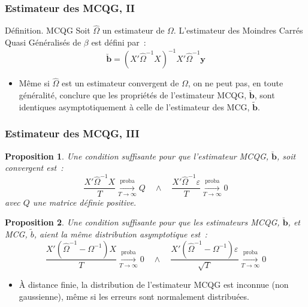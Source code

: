 \documentclass[10pt]{beamer}
\newcommand{\plim}{\overset{\text{proba}}{\underset{T\rightarrow\infty}{\longrightarrow}}}
\theoremstyle{plain}
\newenvironment{defn}[1]
{\bgroup \small\begin{block}{Définition. #1}}
  {\end{block}\egroup}
\newtheorem{prop}{Proposition}
\begin{document}
\begin{frame}
  \frametitle{Estimateur des MCQG, II}

  \begin{defn}{MCQG}
    Soit $\widehat\Omega$ un estimateur de $\Omega$. L'estimateur des Moindres Carrés Quasi Généralisés de $\beta$ est défini par~:
    \[
      \breve{\mathbf b} = \left( X'\widehat{\Omega}^{-1}X \right)^{-1}X'\widehat{\Omega}^{-1}\mathbf y
    \]
  \end{defn}

  \bigskip\medskip

  \begin{itemize}

  \item[\dbend] Même si $\widehat\Omega$ est un estimateur convergent de $\Omega$, on ne peut pas, en toute généralité, conclure que les propriétés de l'estimateur MCQG, $\breve{\mathbf b}$, sont identiques asymptotiquement à celle de l'estimateur des MCG, $\tilde{\mathbf b}$.

  \end{itemize}

\end{frame}


\begin{frame}
  \frametitle{Estimateur des MCQG, III}

  \begin{prop}\label{prop:mcqg:convergence}
    Une condition suffisante pour que l'estimateur MCQG, $\breve{\mathbf b}$, soit convergent est~:
    \[
      \frac{X'\widehat{\Omega}^{-1}X}{T} \plim Q \quad \land \quad \frac{X'\widehat{\Omega}^{-1}\varepsilon}{T} \plim 0
    \]
    avec $Q$ une matrice définie positive.
  \end{prop}


  \begin{prop}\label{prop:mcqg:adist}
    Une condition suffisante pour que les estimateurs MCQG, $\breve{\mathbf b}$, et MCG, $\tilde{b}$, aient la même distribution asymptotique est~:
    \[
      \frac{X'\left( \widehat{\Omega}^{-1} - \Omega^{-1} \right) X}{T} \plim 0 \quad \land \quad \frac{X' \left( \widehat{\Omega}^{-1} - \Omega^{-1} \right)  \varepsilon}{\sqrt{T}} \plim 0
    \]
  \end{prop}


  \begin{itemize}

  \item[\dbend] À distance finie, la distribution de l'estimateur MCQG est inconnue (non gaussienne), même si les erreurs sont normalement distribuées.

  \end{itemize}

\end{frame}
\end{document}
